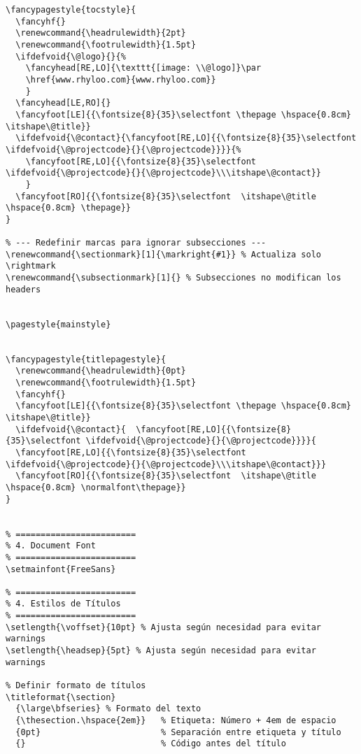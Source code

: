 \documentclass{reporti}
\begin{document}
\begin{verbatim}
\fancypagestyle{tocstyle}{
  \fancyhf{}
  \renewcommand{\headrulewidth}{2pt}
  \renewcommand{\footrulewidth}{1.5pt}
  \ifdefvoid{\@logo}{}{%
    \fancyhead[RE,LO]{\texttt{[image: \\@logo]}\par
    \href{www.rhyloo.com}{www.rhyloo.com}}
    }
  \fancyhead[LE,RO]{}
  \fancyfoot[LE]{{\fontsize{8}{35}\selectfont \thepage \hspace{0.8cm} \itshape\@title}}
  \ifdefvoid{\@contact}{\fancyfoot[RE,LO]{{\fontsize{8}{35}\selectfont \ifdefvoid{\@projectcode}{}{\@projectcode}}}}{%
    \fancyfoot[RE,LO]{{\fontsize{8}{35}\selectfont \ifdefvoid{\@projectcode}{}{\@projectcode}\\\itshape\@contact}}
    }
  \fancyfoot[RO]{{\fontsize{8}{35}\selectfont  \itshape\@title \hspace{0.8cm} \thepage}}
}

% --- Redefinir marcas para ignorar subsecciones ---
\renewcommand{\sectionmark}[1]{\markright{#1}} % Actualiza solo \rightmark
\renewcommand{\subsectionmark}[1]{} % Subsecciones no modifican los headers


\pagestyle{mainstyle}


\fancypagestyle{titlepagestyle}{
  \renewcommand{\headrulewidth}{0pt}
  \renewcommand{\footrulewidth}{1.5pt}
  \fancyhf{}
  \fancyfoot[LE]{{\fontsize{8}{35}\selectfont \thepage \hspace{0.8cm} \itshape\@title}}
  \ifdefvoid{\@contact}{  \fancyfoot[RE,LO]{{\fontsize{8}{35}\selectfont \ifdefvoid{\@projectcode}{}{\@projectcode}}}}{
  \fancyfoot[RE,LO]{{\fontsize{8}{35}\selectfont \ifdefvoid{\@projectcode}{}{\@projectcode}\\\itshape\@contact}}}
  \fancyfoot[RO]{{\fontsize{8}{35}\selectfont  \itshape\@title \hspace{0.8cm} \normalfont\thepage}}
}


% ========================
% 4. Document Font
% ========================
\setmainfont{FreeSans}

% ========================
% 4. Estilos de Títulos
% ========================
\setlength{\voffset}{10pt} % Ajusta según necesidad para evitar warnings
\setlength{\headsep}{5pt} % Ajusta según necesidad para evitar warnings

% Definir formato de títulos
\titleformat{\section}
  {\large\bfseries} % Formato del texto
  {\thesection.\hspace{2em}}   % Etiqueta: Número + 4em de espacio
  {0pt}                        % Separación entre etiqueta y título
  {}                           % Código antes del título


\end{verbatim}
\end{document}
